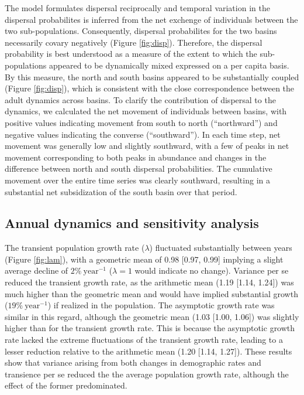 The model formulates dispersal reciprocally and temporal variation in the 
dispersal probabilites is inferred from the net exchenge of individuals between
the two sub-populations.
Consequently, dispersal probabilites for the two basins necessarily covary negatively 
(Figure \ref{fig:disp}).
Therefore, the dispersal probability is best understood as a measure of the extent 
to which the sub-populations appeared to be dynamically mixed
expressed on a per capita basis.
By this measure, the north and south basins appeared 
to be substantially coupled (Figure \ref{fig:disp}), 
which is consistent with the close correspondence 
between the adult dynamics across basins.
To clarify the contribution of dispersal to the dynamics, 
we calculated the net movement of individuals between basins,
with positive values indicating movement from south to north (``northward'')
and negative values indicating the converse (``southward'').
In each time step, 
net movement was generally low and slightly southward,
with a few of peaks in net movement corresponding to 
both peaks in abundance
and changes in the difference between north and south dispersal probabilities.
The cumulative movement over the entire time series was clearly southward,
resulting in a substantial net subsidization of the south basin over that period.



\subsection*{Annual dynamics and sensitivity analysis} 

The transient population growth rate ($\lambda$) fluctuated substantially between years
(Figure \ref{fig:lam}),
with a geometric mean of 0.98 [0.97, 0.99] implying a slight average decline
of $2\%~\text{year}^{-1}$ ($\lambda = 1$ would indicate no change).
Variance per se reduced the transient growth rate, 
as the arithmetic mean (1.19 [1.14, 1.24]) was much higher than the geometric mean
and would have implied substantial growth ($19\%~\text{year}^{-1}$)
if realized in the population.
The asymptotic growth rate was similar in this regard,
although the geometric mean (1.03 [1.00, 1.06]) was slightly higher 
than for the transient growth rate.
This is because the asymptotic growth rate lacked the extreme fluctuations 
of the transient growth rate,
leading to a lesser reduction relative to the arithmetic mean (1.20 [1.14, 1.27]).
These results show that variance arising from both changes in demographic
rates and transience per se reduced the the average population growth rate,
although the effect of the former predominated.

